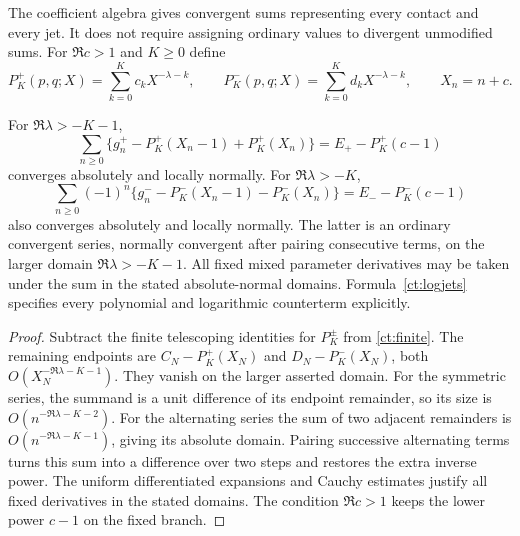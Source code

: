 The coefficient algebra gives convergent sums representing every contact
and every jet. It does not require assigning ordinary values to divergent
unmodified sums. For $\Re c>1$ and $K\ge0$ define
\begin{equation}\label{ct:PK}
 P_K^+(p,q;X)=\sum_{k=0}^Kc_kX^{-\lambda-k},\qquad
 P_K^-(p,q;X)=\sum_{k=0}^Kd_kX^{-\lambda-k},\qquad X_n=n+c.
\end{equation}

\begin{theorem}\label{ct:normal}
For $\Re\lambda>-K-1$,
\begin{equation}\label{ct:normalplus}
 \sum_{n\ge0}\{g_n^+-P_K^+(X_n-1)+P_K^+(X_n)\}
             =E_+-P_K^+(c-1)
\end{equation}
converges absolutely and locally normally. For $\Re\lambda>-K$,
\begin{equation}\label{ct:normalminus}
 \sum_{n\ge0}(-1)^n\{g_n^--P_K^-(X_n-1)-P_K^-(X_n)\}
             =E_--P_K^-(c-1)
\end{equation}
also converges absolutely and locally normally. The latter is an ordinary
convergent series, normally convergent after pairing consecutive terms,
on the larger domain $\Re\lambda>-K-1$.
All fixed mixed parameter derivatives may be taken under the sum in the
stated absolute-normal domains. Formula~\eqref{ct:logjets} specifies
every polynomial and logarithmic counterterm explicitly.
\end{theorem}
\begin{proof}
Subtract the finite telescoping identities for $P_K^\pm$ from
\eqref{ct:finite}. The remaining endpoints are
$C_N-P_K^+(X_N)$ and $D_N-P_K^-(X_N)$, both
$O(X_N^{-\Re\lambda-K-1})$. They vanish on the larger asserted domain.
For the symmetric series, the summand is a unit difference of its endpoint
remainder, so its size is $O(n^{-\Re\lambda-K-2})$. For the alternating
series the sum of two adjacent remainders is
$O(n^{-\Re\lambda-K-1})$, giving its absolute domain. Pairing successive
alternating terms turns this sum into a difference over two steps and
restores the extra inverse power. The uniform differentiated expansions
and Cauchy estimates justify all fixed derivatives in the stated domains.
The condition $\Re c>1$ keeps the lower power $c-1$ on the fixed branch.
\end{proof}

